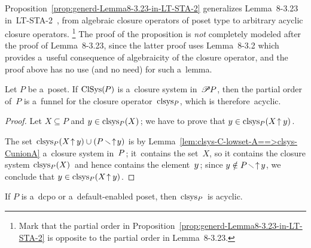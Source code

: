 \documentclass[11pt,letterpaper]{article}
\renewcommand{\emph}[1]{\textit{#1\/}}
\renewcommand{\thmskip}{\bigskip}
\renewcommand{\interskip}{\medskip}
\begin{document}
\thmskip

Proposition~\ref{prop:generd-Lemma8-3.23-in-LT-STA-2} generalizes
	Lemma~8-3.23 in~LT-STA-2~\cite{LT-STA-2},
from algebraic closure operators of poset type to arbitrary acyclic closure operators.%
%
\footnote{Mark that the partial order in Proposition~\ref{prop:generd-Lemma8-3.23-in-LT-STA-2}
is opposite to the partial order in Lemma~8-3.23.}
%
The proof of the proposition is \emph{not} completely modeled after the proof of Lemma~8-3.23,
since the latter proof uses Lemma~8-3.2
	which provides a~useful consequence of algebraicity of the closure operator,
and the proof above has no use (and no need) for such a~lemma.

\thmskip

\begin{proposition}\label{prop:ClSys(P)-clsys-in-PowP=>clsysP-is-acyclic}
Let\/ $P$ be a~poset.
If\/ $\mathop{\smash{\mathrm{ClSys}}}\nolimits(\mspace{-1mu} P)$ is a~closure system in\/~$\mathscr{P}\mspace{-1mu} P$,
then the partial order of\/~$P$ is a~funnel for the closure operator\/~$\mathop{\smash{\mathrm{clsys}}}\nolimits_P$,
which is therefore~acyclic.
\end{proposition}

\interskip

\begin{proof}
Let $X\subseteq P$ and $y\in\mathop{\smash{\mathrm{clsys}}}\nolimits_P(X)\mspace{2mu}$;
we have to prove that $y\in\mathop{\smash{\mathrm{clsys}}}\nolimits_P(X\mspace{-2mu}\mathbin{\uparrow} y)\mspace{1mu}$.

The set $\dtinysp\clsys_P(\allabove{X\negdtinysp}{y})
				\union(P\narrt\setdiff\narrt\lup y)$
    is by Lemma~\ref{lem:clsys-C-lowset-A==>clsys-CunionA}
	a~closure system in~$P\mspace{1mu}$;
it~contains the set~$X$,
so it contains the closure system $\mspace{2mu}\mathop{\smash{\mathrm{clsys}}}\nolimits_P(X)\mspace{2mu}$
	and hence contains the element~$y\mspace{2mu}$;
since $y\notin P\mspace{-2mu}\mathbin{\smallsetminus}\mspace{-2mu}\mathop{\smash{\uparrow}}\nolimits y$,
we conclude that $y\in\mathop{\smash{\mathrm{clsys}}}\nolimits_P(X\mspace{-2mu}\mathbin{\uparrow} y)\mspace{1mu}$.
\end{proof}

\thmskip

\begin{corollary}\label{cor:P-dcpo-or-dfltenab==>clsysP-acyclic}
If\/ $P$ is a~dcpo or a~default-enabled poset,
then\/ $\mspace{2mu}\mathop{\smash{\mathrm{clsys}}}\nolimits_P\mspace{2mu}$ is acyclic.
\end{corollary}

\thmskip
\end{document}
